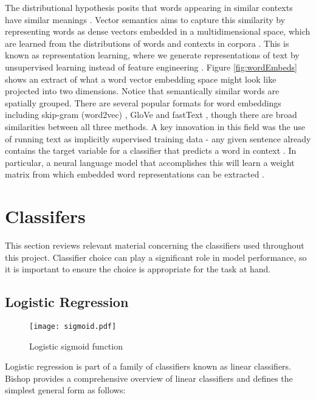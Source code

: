 \documentclass[Dissertation.tex]{subfiles}
\begin{document}
The distributional hypothesis  posits that words appearing in similar contexts have similar meanings \cite{sahlgren2008distributional}. Vector semantics aims to capture this similarity by representing words as dense vectors embedded in a multidimensional space, which are learned from the distributions of words and contexts in corpora \cite{jurafskySpeechLanguageProcessing}. This is known as representation learning, where we generate representations of text by unsupervised learning instead of feature engineering \cite{jurafskySpeechLanguageProcessing}. Figure \ref{fig:wordEmbeds} shows an extract of what a word vector embedding space might look like projected into two dimensions. Notice that semantically similar words are spatially grouped. There are several popular formats for word embeddings including skip-gram (word2vec) \cite{mikolovEfficientEstimationWord2013}, GloVe \cite{penningtonGloveGlobalVectors2014} and fastText \cite{joulinBagTricksEfficient2016}, though there are broad similarities between all three methods. A key innovation in this field was the use of running text as implicitly supervised training data - any given sentence already contains the target variable for a classifier that predicts a word in context \cite{jurafskySpeechLanguageProcessing}. In particular, a neural language model that accomplishes this will learn a weight matrix from which embedded word representations can be extracted \cite{jurafskySpeechLanguageProcessing}. 

\section{Classifers}
This section reviews relevant material concerning the classifiers used throughout this project. Classifier choice can play a significant role in model performance, so it is important to ensure the choice is appropriate for the task at hand.
\subsection{Logistic Regression}

\begin{figure}
	\centering
	\texttt{[image: sigmoid.pdf]}
	\caption{Logistic sigmoid function}
	\label{logisticFunction}
\end{figure}
Logistic regression is part of a family of classifiers known as linear classifiers.	Bishop \cite{bishopPatternRecognitionMachine2006} provides a comprehensive overview of linear classifiers and defines the simplest general form as follows:
\end{document}
